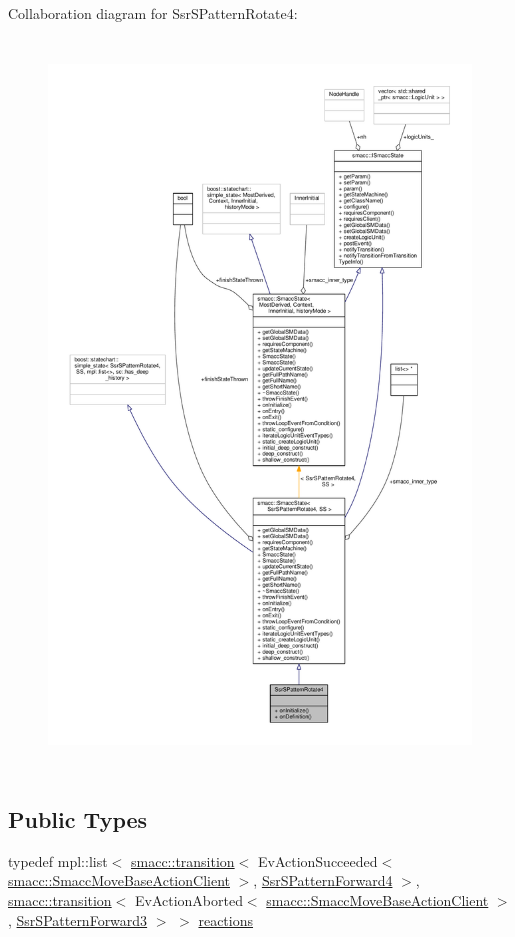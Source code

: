 Collaboration diagram for Ssr\+S\+Pattern\+Rotate4\+:
\nopagebreak
\begin{figure}[H]
\begin{center}
\leavevmode
\includegraphics[height=550pt]{structSsrSPatternRotate4__coll__graph}
\end{center}
\end{figure}
\subsection*{Public Types}
\begin{DoxyCompactItemize}
\item 
typedef mpl\+::list$<$ \hyperlink{classsmacc_1_1transition}{smacc\+::transition}$<$ Ev\+Action\+Succeeded$<$ \hyperlink{classsmacc_1_1SmaccMoveBaseActionClient}{smacc\+::\+Smacc\+Move\+Base\+Action\+Client} $>$, \hyperlink{structSsrSPatternForward4}{Ssr\+S\+Pattern\+Forward4} $>$, \hyperlink{classsmacc_1_1transition}{smacc\+::transition}$<$ Ev\+Action\+Aborted$<$ \hyperlink{classsmacc_1_1SmaccMoveBaseActionClient}{smacc\+::\+Smacc\+Move\+Base\+Action\+Client} $>$, \hyperlink{structSsrSPatternForward3}{Ssr\+S\+Pattern\+Forward3} $>$ $>$ \hyperlink{structSsrSPatternRotate4_a876753525a2db93f305ce372622413a3}{reactions}
\end{DoxyCompactItemize}
